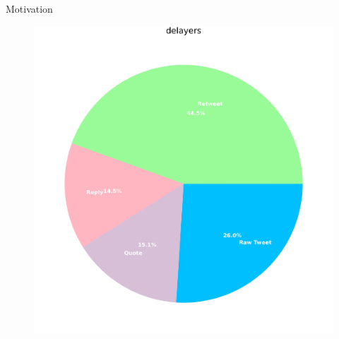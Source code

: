 \documentclass[xcolor=table,handout]{beamer}
\begin{document}
\begin{frame}{Motivation}
\begin{figure}
\begin{minipage}{.3\textwidth}
\end{minipage}
\begin{minipage}{.3\textwidth}
  \centering
  \includegraphics[scale = 0.07]{./img/pie_tweets_delayers.jpg}
\end{minipage}
\end{figure}

\end{frame}
\end{document}

